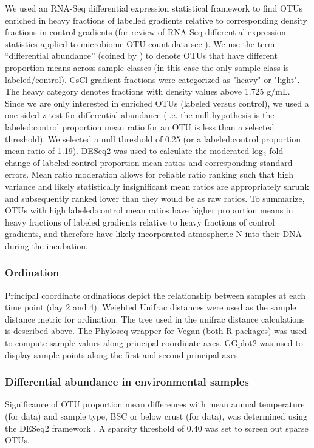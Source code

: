 We used an RNA-Seq differential expression statistical framework
\citep{Love_2014} to find OTUs enriched in heavy fractions of labelled gradients
relative to corresponding density fractions in control gradients (for review of
RNA-Seq differential expression statistics applied to microbiome OTU count data
see \citet{24699258}). We use the term “differential abundance” (coined
by \citet{24699258}) to denote OTUs that have different proportion means
across sample classes (in this case the only sample class is labeled/control).
CsCl gradient fractions were categorized as "heavy" or "light". The heavy
category denotes fractions with density values above 1.725 g/mL. Since we are
only interested in enriched OTUs (labeled versus control), we used a one-sided
z-test for differential abundance (i.e. the null hypothesis is the
labeled:control proportion mean ratio for an OTU is less than a selected
threshold). We selected a null threshold of 0.25 (or a labeled:control
proportion mean ratio of 1.19). DESeq2 was used to calculate the moderated
log$_{2}$ fold change of labeled:control proportion mean ratios and
corresponding standard errors. Mean ratio moderation allows for reliable ratio
ranking such that high variance and likely statistically insignificant mean
ratios are appropriately shrunk and subsequently ranked lower than they would
be as raw ratios. To summarize, OTUs with high labeled:control mean ratios have
higher proportion means in heavy fractions of labeled gradients relative to
heavy fractions of control gradients, and therefore have likely incorporated
atmospheric N into their DNA during the incubation.

\subsubsection{Ordination}
Principal coordinate ordinations depict the relationship between samples at each time point (day 2 and 4). Weighted Unifrac distances \citep{16332807} were used as the sample distance metric for ordination. The tree used in the unifrac distance calculations is described above. The Phyloseq \citep{24699258} wrapper for Vegan \citep{vegan} (both R packages) was used to compute sample values along principal coordinate axes. GGplot2 \citep{ggplot2} was used to display sample points along the first and second principal axes.  

\subsubsection{Differential abundance in environmental samples}
Significance of OTU proportion mean differences with mean annual temperature
(for \citet{Garcia_Pichel_2013} data) and sample type, BSC or below crust (for
\citet{Steven_2013} data), was determined using the DESeq2 framework
\citep{24699258, Love_2014}. A sparsity threshold of 0.40 was set to screen out
sparse OTUs.  

